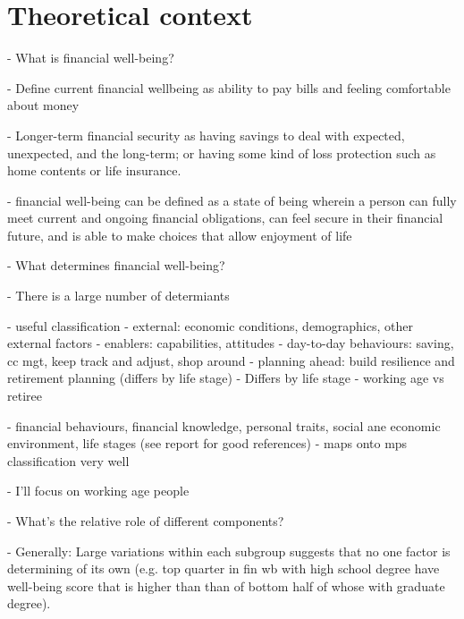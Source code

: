 
\section{Theoretical context}%
\label{sec:theoretical_context}



- What is financial well-being?

\citet{mps2018building}
- Define current financial wellbeing as ability to pay bills and feeling
comfortable about money

- Longer-term financial security as having savings to deal with expected,
unexpected, and the long-term; or having some kind of loss protection such as
home contents or life insurance.

\citet{cfpb2015financial}
- financial well-being can be defined as a state of being wherein a person can fully meet current and ongoing financial obligations, can feel secure in their financial future, and is able to make choices that allow enjoyment of life




- What determines financial well-being?

- There is a large number of determiants

\citet{mps2018building}
- useful classification
- external: economic conditions, demographics, other external factors
- enablers: capabilities, attitudes
- day-to-day behaviours: saving, cc mgt, keep track and adjust, shop around
- planning ahead: build resilience and retirement planning (differs by life
stage)
- Differs by life stage - working age vs retiree

\citet{cfpb2015financial}
- financial behaviours, financial knowledge, personal traits, social ane economic
environment, life stages (see report for good references)
- maps onto mps classification very well

- I'll focus on working age people




- What's the relative role of different components?

\citet{cfpb2017financial}

- Generally: Large variations within each subgroup suggests that no one factor is
determining of its own (e.g. top quarter in fin wb with high school degree have
well-being score that is higher than than of bottom half of whose with graduate
degree).

